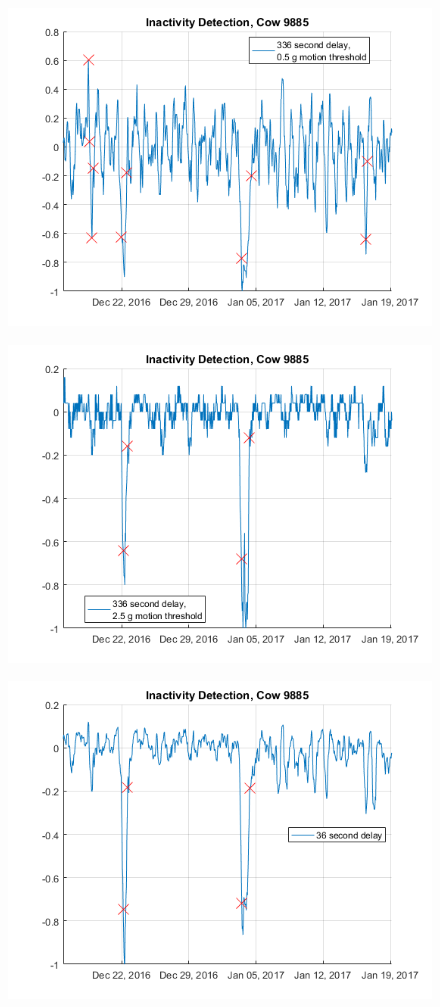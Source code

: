 \begin{figure}[h]
\centering
\includegraphics[width = 0.75 \textwidth]{figures/InactivityDetectionCow9885_336period05threshold.png}
\caption{}
\label{}
\end{figure}

\begin{figure}[h]
\centering
\includegraphics[width = 0.75 \textwidth]{figures/InactivityDetectionCow9885_336period2_5threshold.png}
\caption{}
\label{}
\end{figure}

\begin{figure}[h]
\centering
\includegraphics[width = 0.75 \textwidth]{figures/InactivityDetectionCow9885_36period.png}
\caption{}
\label{}
\end{figure}

